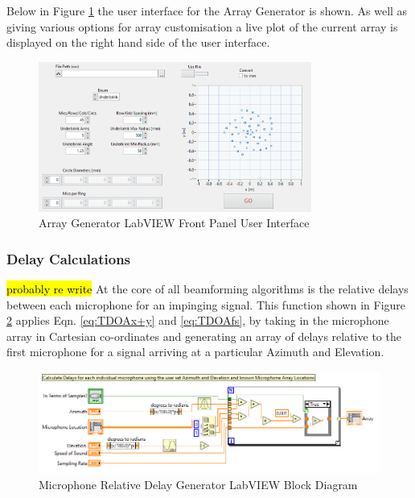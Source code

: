 \documentclass{UoNMCHA}
\numberwithin{equation}{section}
\begin{document}
    Below in Figure \ref{fig:ArrayGenPanel} the user interface for the Array Generator is shown. As well as giving various options for array customisation a live plot of the current array is displayed on the right hand side of the user interface.  
    
    \begin{figure}[H]
        \centering
        \includegraphics[keepaspectratio, width = 0.8\textwidth]{Figures/ArrayGenPanel.png}
        \caption{Array Generator LabVIEW Front Panel User Interface}
        \label{fig:ArrayGenPanel}
    \end{figure}
    
\subsubsection{Delay Calculations} \label{sec:Delay Calculations}
    \hl{probably re write}
    At the core of all beamforming algorithms is the relative delays between each microphone for an impinging signal. This function shown in Figure \ref{fig:MicDelayBlock} applies Eqn. \ref{eq:TDOAx+y} and \ref{eq:TDOAfs}, by taking in the microphone array in Cartesian co-ordinates and generating an array of delays relative to the first microphone for a signal arriving at a particular Azimuth and Elevation.
    
    \begin{figure}[H]
        \centering
        \includegraphics[keepaspectratio, width = \textwidth]{Figures/DelayCalcBlock.png}
        \caption{Microphone Relative Delay Generator LabVIEW Block Diagram}
        \label{fig:MicDelayBlock}
    \end{figure}    
    
\end{document}
